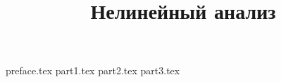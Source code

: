 

\title{Нелинейный анализ}

\makeindex

\maketitle

{preface.tex}
{part1.tex}
{part2.tex}
{part3.tex}

%

\tableofcontents

